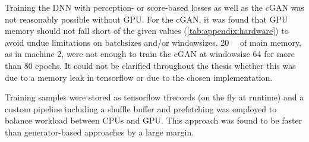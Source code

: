 Training the DNN with perception- or score-based losses as well as the cGAN was not reasonably possible without GPU.
For the cGAN, it was found that GPU memory should not fall short of the given values (\cref{tab:appendix:hardware})
to avoid undue limitations on batchsizes and/or windowsizes.
\SI{20}{\giga\byte} of main memory, as in machine 2, were not enough to train the cGAN at windowsize 64 for more than 80 epochs.
It could not be clarified throughout the thesis whether this was due to a memory leak in tensorflow or due to the chosen implementation.

Training samples were stored as tensorflow tfrecords (on the fly at runtime) and a custom pipeline including a shuffle buffer and prefetching 
was employed to balance workload between CPUs and GPU.
This approach was found to be faster than generator-based approaches by a large margin.
